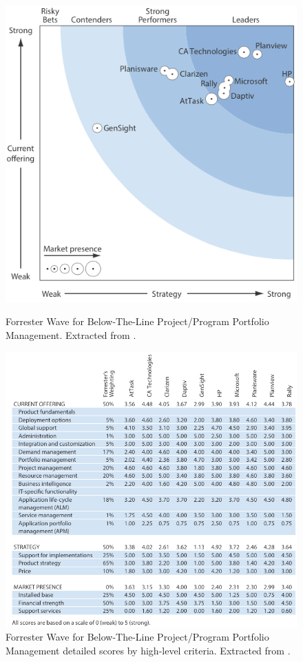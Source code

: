 \begin{figure}[th!]
\begin{minipage}[th!]{0.40\linewidth}
\centering
\includegraphics[width=\textwidth]{img/BelowLineWave.png}
\caption{Forrester Wave for Below-The-Line Project/Program Portfolio Management. Extracted from \cite{forresterWavePPM}.}
\label{fig:figure1}
\end{minipage}
\hspace{0.5cm}
\begin{minipage}[th!]{0.60\linewidth}
\centering
\includegraphics[width=\textwidth]{img/BelowLineScores.png}
\caption{Forrester Wave for Below-The-Line Project/Program Portfolio Management detailed scores by high-level criteria. Extracted from \cite{forresterWavePPM}.}
\label{fig:figure2}
\end{minipage}
\end{figure}

